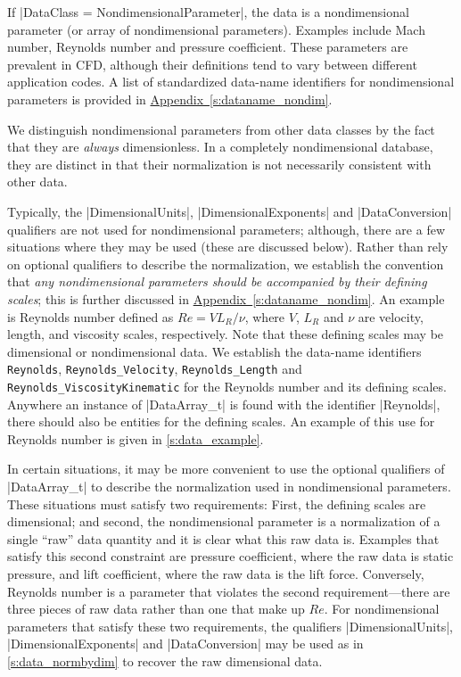 If |DataClass = NondimensionalParameter|, the data is a nondimensional
parameter (or array of nondimensional parameters).  Examples include Mach
number, Reynolds number and pressure coefficient.  These parameters are
prevalent in CFD, although their definitions tend to vary between different
application codes.  A list of standardized data-name identifiers for
nondimensional parameters is provided in
\hyperref[s:dataname_nondim]{Appendix~\ref*{s:dataname_nondim}}.

We distinguish nondimensional parameters from other data classes by
the fact that they are \emph{always} dimensionless.  In a completely
nondimensional database, they are distinct in that their normalization
is not necessarily consistent with other data.

Typically, the |DimensionalUnits|, |DimensionalExponents| and
|DataConversion| qualifiers are not used for nondimensional parameters;
although, there are a few situations where they may be used (these are
discussed below).
Rather than rely on optional qualifiers to describe the normalization,
we establish the convention that \emph{any nondimensional parameters
should be accompanied by their defining scales}; this is further
discussed in \hyperref[s:dataname_nondim]{Appendix~\ref*{s:dataname_nondim}}.
An example is Reynolds number defined as $Re = V L_R / \nu$, where $V$,
$L_R$ and $\nu$ are velocity, length, and viscosity scales, respectively.
Note that these defining scales may be dimensional or nondimensional data.
We establish the data-name identifiers \texttt{Reynolds},
\texttt{Reynolds\_Velocity}, \texttt{Reynolds\_Length} and
\texttt{Reynolds\_ViscosityKinematic} for the Reynolds number and its
defining scales.
Anywhere an instance of |DataArray_t| is found with the identifier
|Reynolds|, there should also be entities for the defining scales.
An example of this use for Reynolds number is given in
\autoref{s:data_example}.

In certain situations, it may be more convenient to use the optional
qualifiers of |DataArray_t| to describe the normalization used
in nondimensional parameters.  These situations must satisfy two
requirements:  First, the defining scales are dimensional; and second,
the nondimensional parameter is a normalization of a single ``raw'' data
quantity and it is clear what this raw data is.  Examples that satisfy
this second constraint are pressure coefficient, where the raw data is
static pressure, and lift coefficient, where the raw data is the lift
force.  Conversely, Reynolds number is a parameter that violates the
second requirement---there are three pieces of raw data rather than one
that make up $Re$.  For nondimensional parameters that satisfy these two
requirements, the qualifiers |DimensionalUnits|, |DimensionalExponents|
and |DataConversion| may be used as in \autoref{s:data_normbydim} to
recover the raw dimensional data.

